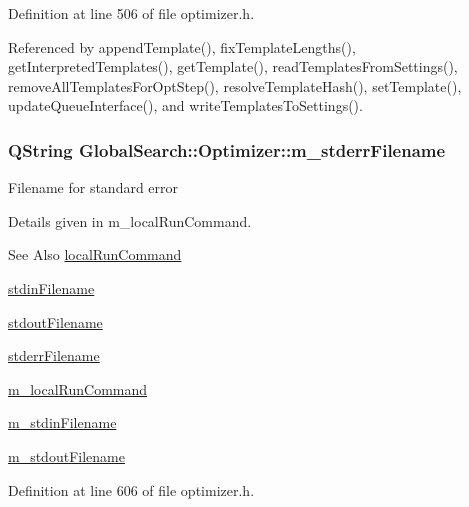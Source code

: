 Definition at line 506 of file optimizer.\-h.



Referenced by append\-Template(), fix\-Template\-Lengths(), get\-Interpreted\-Templates(), get\-Template(), read\-Templates\-From\-Settings(), remove\-All\-Templates\-For\-Opt\-Step(), resolve\-Template\-Hash(), set\-Template(), update\-Queue\-Interface(), and write\-Templates\-To\-Settings().

\hypertarget{classGlobalSearch_1_1Optimizer_a75b800a7f90a03d551f6795404d0c8f1}{
\subsubsection[{m\-\_\-stderr\-Filename}]{\setlength{\rightskip}{0pt plus 5cm}Q\-String Global\-Search\-::\-Optimizer\-::m\-\_\-stderr\-Filename\hspace{0.3cm}{\ttfamily [protected]}}}\label{classGlobalSearch_1_1Optimizer_a75b800a7f90a03d551f6795404d0c8f1}
Filename for standard error

Details given in m\-\_\-local\-Run\-Command.

\begin{DoxySeeAlso}{See Also}
\hyperlink{classGlobalSearch_1_1Optimizer_aed5eb285d45a001c9520c2ed3a5b57a1}{local\-Run\-Command} 

\hyperlink{classGlobalSearch_1_1Optimizer_a5964a9b38d3ae90c8ac36a75d3a35832}{stdin\-Filename} 

\hyperlink{classGlobalSearch_1_1Optimizer_a217750aa50431f9948aa8164fb99de0c}{stdout\-Filename} 

\hyperlink{classGlobalSearch_1_1Optimizer_acaa83cc6bf1dcc263b92450b4f8cb652}{stderr\-Filename} 

\hyperlink{classGlobalSearch_1_1Optimizer_a1cdb6b6c5e929e84c834ba93148fb31e}{m\-\_\-local\-Run\-Command} 

\hyperlink{classGlobalSearch_1_1Optimizer_aca91d12d7aecae052d6ab5ae158acec6}{m\-\_\-stdin\-Filename} 

\hyperlink{classGlobalSearch_1_1Optimizer_a5ed04fdd5f8b511249e408adcd174550}{m\-\_\-stdout\-Filename} 
\end{DoxySeeAlso}


Definition at line 606 of file optimizer.\-h.



